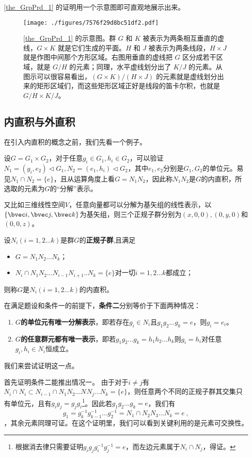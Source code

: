 \autoref{the_GrpPrd_1} 的证明用一个示意图即可直观地展示出来。

\begin{figure}[ht]
\centering
\texttt{[image: ./figures/7576f29d8bc51df2.pdf]}
\caption{\autoref{the_GrpPrd_1} 的示意图。群 $G$ 和 $K$ 被表示为两条相互垂直的虚线，$G\times K$ 就是它们生成的平面。$H$ 和 $J$ 被表示为两条线段，$H\times J$ 就是作图中间那个方形区域。右图用垂直的虚线把 $G$ 区分成若干区域，就是 $G/H$ 的元素；同理，水平虚线划分出了 $K/J$ 的元素。从图示可以很容易看出，$(G\times K)/(H\times J)$ 的元素就是虚线划分出来的矩形区域们，而这些矩形区域正好是线段的笛卡尔积，也就是 $G/H\times K/J$。} \label{fig_GrpPrd_1}
\end{figure}
\subsection{内直积与外直积}
在引入内直积的概念之前，我们先看一个例子。

设$G=G_1\times G_2$，对于任意$g_i\in G_1,h_i\in G_2$，可以验证$N_1=(g_i,e_2)\vartriangleleft G_1,N_2=(e_1,h_i)\vartriangleleft G_2$，其中$e_1,e_2$分别是$G_1,G_2$的单位元。易见$N_1\cap N_2=\{e\}$，且从运算角度上看$G=N_1N_2$，因此称$N_1N_2$是$G$的内直积，所选取的元素为$G$的“分解”表示。

又比如三维线性空间$V$，任意向量都可以分解为基矢组的线性表示，以$\{\bvec i,\bvec j,\bvec k\}$为基矢组，则三个正规子群分别为$(x,0,0),(0,y,0)$和$(0,0,z)$。
\begin{definition}{}
设$N_i(i=1,2...k)$是群$G$的\textbf{正规子群},且满足
\begin{itemize}
\item $G=N_1N_2...N_k$；
\item $N_i\cap N_1N_2...N_{i-1}N_{i+1}..N_k=\{e\}$对一切$i=1,2...k$都成立；
\end{itemize}
则称$G$是$N_i(i=1,2...k)$的内直积。
\end{definition}
在满足题设和条件一的前提下，\textbf{条件二}分别等价于下面两种情况：
\begin{enumerate}
\item \textbf{$G$的单位元有唯一分解表示}，即若存在$g_i\in N_i$且$g_1g_2...g_k=e$，则$g_i=e_i$。
\item \textbf{$G$的任意群元都有唯一表示}，即若$g_1g_2...g_k=h_1h_2...h_k$则$g_i=h_i$对任意$g_i,h_i\in N_i$恒成立。
\end{enumerate}
我们来尝试证明这一点。

首先证明条件二能推出情况一。
由于对于$i\neq j$有$N_i\cap N_i\subset N_{i-1}\cap N_1N_2...N_{}N_j...N_k=\{e\}$，则任意两个不同的正规子群其交集只有单位元，且有$g_ig_j=g_jg_i$\footnote{根据消去律只需要证明$g_ig_jg_i^{-1}g_j^{-1}=e$，而左边元素属于$N_i\cap N_j$，得证。}。因此若$g_1g_2...g_k=e$，我们有
\begin{equation}
g_1=g_k^{-1}g_{k-1}^{-1}...g_2^{-1}=N_1\cap N_2N_3...N_k=e~,
\end{equation}
，其余元素同理可证。在这个证明里，我们可以看到关键利用的是元素可交换性。

